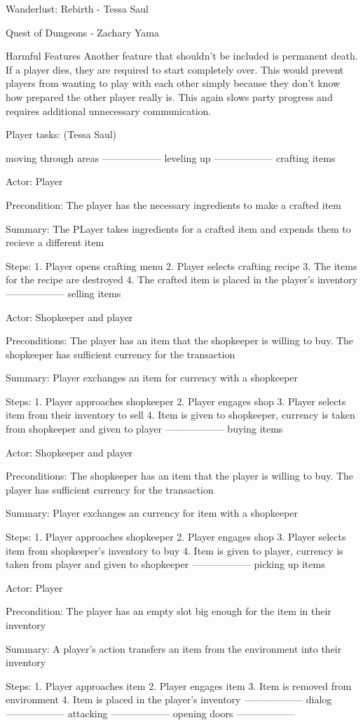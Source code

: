 \documentclass[12pt]{report}
\begin{document}
\begin{section}{Wanderlust: Rebirth - Tessa Saul}
\begin{section}{Quest of Dungeons - Zachary Yama}
\begin{subsection}{Harmful Features}
Another feature that shouldn’t be included is permanent death. If a player dies, they are required to 
start completely over. This would prevent players from wanting to play with each other simply because 
they don’t know how prepared the other player really is. This again slows party progress and requires 
additional unnecessary communication.
 
\end{subsection}
\end{section}
 


Player tasks: (Tessa Saul)

moving through areas 
------------------
leveling up
------------------
crafting items

Actor: Player

Precondition: The player has the necessary ingredients to make a crafted item

Summary: The PLayer takes ingredients for a crafted item and expends them to recieve a different item

Steps:
1. Player opens crafting menu
2. Player selects crafting recipe
3. The items for the recipe are destroyed
4. The crafted item is placed in the player's inventory
------------------
selling items

Actor: Shopkeeper and player

Preconditions: The player has an item that the shopkeeper is willing to buy. The shopkeeper has sufficient
currency for the transaction

Summary: Player exchanges an item for currency with a shopkeeper

Steps: 
1. Player approaches shopkeeper
2. Player engages shop
3. Player selects item from their inventory to sell
4. Item is given to shopkeeper, currency is taken from shopkeeper and given to player
------------------
buying items

Actor: Shopkeeper and player

Preconditions: The shopkeeper has an item that the player is willing to buy. The player has sufficient
currency for the transaction

Summary: Player exchanges an currency for item with a shopkeeper

Steps: 
1. Player approaches shopkeeper
2. Player engages shop
3. Player selects item from shopkeeper's inventory to buy
4. Item is given to player, currency is taken from player and given to shopkeeper
------------------
picking up items

Actor: Player

Precondition: The player has an empty slot big enough for the item in their inventory

Summary: A player's action transfers an item from the environment into their inventory

Steps:
1. Player approaches item
2. Player engages item
3. Item is removed from environment
4. Item is placed in the player's  inventory
------------------
dialog
------------------
attacking
------------------
opening doors
------------------


\end{section}
\end{document}
